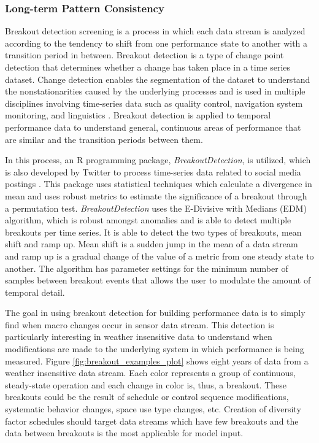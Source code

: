 \subsubsection{Long-term Pattern Consistency}
\label{sec:patternconsistency}

Breakout detection screening is a process in which each data stream is analyzed according to the tendency to shift from one performance state to another with a transition period in between. Breakout detection is a type of change point detection that determines whether a change has taken place in a time series dataset. Change detection enables the segmentation of the dataset to understand the nonstationarities caused by the underlying processes and is used in multiple disciplines involving time-series data such as quality control, navigation system monitoring, and linguistics \cite{Basseville:1993wp}. Breakout detection is applied to temporal performance data to understand general, continuous areas of performance that are similar and the transition periods between them.

In this process, an R programming package, \emph{BreakoutDetection}, is utilized, which is also developed by Twitter to process time-series data related to social media postings \cite{BreakoutDetectionR:ZPAelpSe}. This package uses statistical techniques which calculate a divergence in mean and uses robust metrics to estimate the significance of a breakout through a permutation test. \emph{BreakoutDetection} uses the E-Divisive with Medians (EDM) algorithm, which is robust amongst anomalies and is able to detect multiple breakouts per time series. It is able to detect the two types of breakouts, mean shift and ramp up. Mean shift is a sudden jump in the mean of a data stream and ramp up is a gradual change of the value of a metric from one steady state to another. The algorithm has parameter settings for the minimum number of samples between breakout events that allows the user to modulate the amount of temporal detail.

The goal in using breakout detection for building performance data is to simply find when macro changes occur in sensor data stream. This detection is particularly interesting in weather insensitive data to understand when modifications are made to the underlying system in which performance is being measured. Figure \ref{fig:breakout_examples_plot} shows eight years of data from a weather insensitive data stream. Each color represents a group of continuous, steady-state operation and each change in color is, thus, a breakout. These breakouts could be the result of schedule or control sequence modifications, systematic behavior changes, space use type changes, etc. Creation of diversity factor schedules should target data streams which have few breakouts and the data between breakouts is the most applicable for model input.